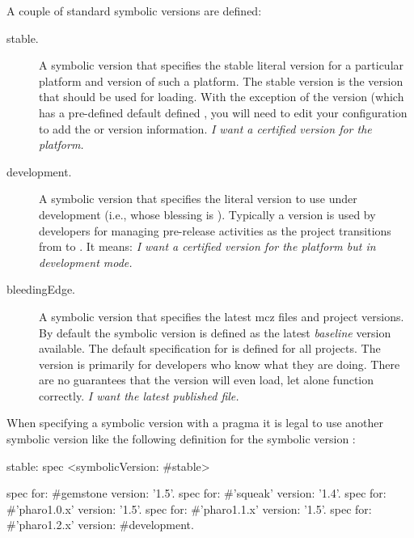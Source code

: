 \documentclass[a4paper,10pt,twoside]{book}
\begin{document}
A couple of standard symbolic versions are defined:

\begin{description}
\item[stable.] A symbolic version that specifies the stable literal version for a particular platform and version of such a platform. The stable version is the version that should be used for loading. With the exception of the  version (which has a pre-defined default defined%
, you will need to edit your configuration to add the  or  version information. \emph{I want a certified version for the platform.}

\item[development.] A symbolic version that specifies the literal version to use under development (i.e., whose blessing is ). Typically a  version is used by developers for managing pre-release activities as the project transitions from  to . %
It means: \emph{I want a certified version for the platform but in development mode.}



\item[bleedingEdge.]  A symbolic version that specifies the latest mcz files and project versions. By default the  symbolic version is defined as the latest \emph{baseline} version available. The default specification for  is defined for all projects. The  version is primarily for developers who know what they are doing. There are no guarantees that the  version will even load, let alone function correctly. \emph{I want the latest published file.}

\end{description}


When specifying a symbolic version with a  pragma it is legal to use another symbolic version like the following definition for the symbolic version :

\begin{code}{}
stable: spec
       <symbolicVersion: #stable>

       spec for: #gemstone version: '1.5'.
       spec for: #'squeak' version: '1.4'.
       spec for: #'pharo1.0.x' version: '1.5'.
       spec for: #'pharo1.1.x' version: '1.5'.
       spec for: #'pharo1.2.x' version: #development.
\end{code}
\end{document}
